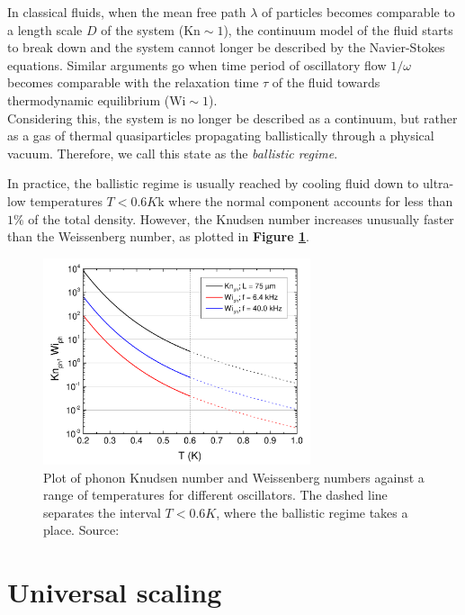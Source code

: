 In classical fluids, when the mean free path $\lambda$ of particles becomes comparable to a length scale $D$ of the system ($\text{Kn} \sim 1$), the continuum model of the fluid starts to break down and the system cannot longer be described by the Navier-Stokes equations. Similar arguments go when time period of oscillatory flow $1/\omega$ becomes comparable with the relaxation time $\tau$ of the fluid towards thermodynamic equilibrium ($\text{Wi} \sim 1$).\\
Considering this, the system is no longer be described as a continuum, but rather as a gas of thermal quasiparticles propagating ballistically through a physical vacuum. Therefore, we call this state as the \textit{ballistic regime}.

In practice, the ballistic regime is usually reached by cooling fluid down to ultra-low temperatures $T < 0.6\unit{K}$k where the normal component accounts for less than $1\%$ of the total density. However, the Knudsen number increases unusually faster than the Weissenberg number, as plotted in \textbf{Figure \ref{Kn-Wi}}.

\begin{figure}[h]
	\centering
	\includegraphics[width=0.7\textwidth]{graphics/theory/ballistic}
	\caption{Plot of phonon Knudsen number and Weissenberg numbers against a range of temperatures for different oscillators. The dashed line separates the interval $T < 0.6\unit{K}$, where the ballistic regime takes a place. Source:\cite{universal_scaling}}
	\label{Kn-Wi}
\end{figure}

\newpage

\section{Universal scaling}

